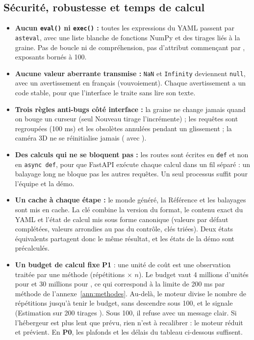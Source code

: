 \documentclass[11pt,a4paper]{article}
\newcommand{\pzero}{\colorbox{ctCorrection!18}{\footnotesize\textbf{P0}}}
\newcommand{\pone}{\colorbox{ctMethod!18}{\footnotesize\textbf{P1}}}
\begin{document}
\subsection{Sécurité, robustesse et temps de calcul}\label{sec:robustesse}
\begin{itemize}[leftmargin=*, nosep]
  \item \textbf{Aucun \texttt{eval()} ni \texttt{exec()} :} toutes les expressions du YAML passent par \texttt{asteval}, avec une liste blanche de fonctions NumPy et des tirages liés à la graine. Pas de boucle ni de compréhension, pas d'attribut commençant par \code{_}, exposants bornés à 100.
  \item \textbf{Aucune valeur aberrante transmise :} \texttt{NaN} et \texttt{Infinity} deviennent \texttt{null}, avec un avertissement en français (vouvoiement). Chaque avertissement a un code stable, pour que l'interface le traite sans lire son texte.
  \item \textbf{Trois règles anti-bugs côté interface :} la graine ne change jamais quand on bouge un curseur (seul \og Nouveau tirage \fg{} l'incrémente) ; les requêtes sont regroupées (100 ms) et les obsolètes annulées pendant un glissement ; la caméra 3D ne se réinitialise jamais ( avec ).
  \item \textbf{Des calculs qui ne se bloquent pas :} les routes sont écrites en \texttt{def} et non en \texttt{async def}, pour que FastAPI exécute chaque calcul dans un fil séparé : un balayage long ne bloque pas les autres requêtes. Un seul processus suffit pour l'équipe et la démo.
  \item \textbf{Un cache à chaque étape :} le monde généré, la Référence et les balayages sont mis en cache. La clé combine la version du format, le contenu exact du YAML et l'état de calcul mis sous forme canonique (valeurs par défaut complétées, valeurs arrondies au pas du contrôle, clés triées). Deux états équivalents partagent donc le même résultat, et les états de la démo sont précalculés.
  \item \textbf{Un budget de calcul fixe} \pone{} : une unité de coût est une observation traitée par une méthode (répétitions $\times$ $n$). Le budget vaut 4 millions d'unités pour  et 30 millions pour , ce qui correspond à la limite de 200 ms par méthode de l'annexe~\ref{ann:methodes}. Au-delà, le moteur divise le nombre de répétitions jusqu'à tenir le budget, sans descendre sous 100, et le signale (\og Estimation sur 200 tirages \fg{}). Sous 100, il refuse avec un message clair. Si l'hébergeur est plus lent que prévu, rien n'est à recalibrer : le moteur réduit et prévient. En \pzero{}, les plafonds et les délais du tableau ci-dessous suffisent.
\end{itemize}
\end{document}
